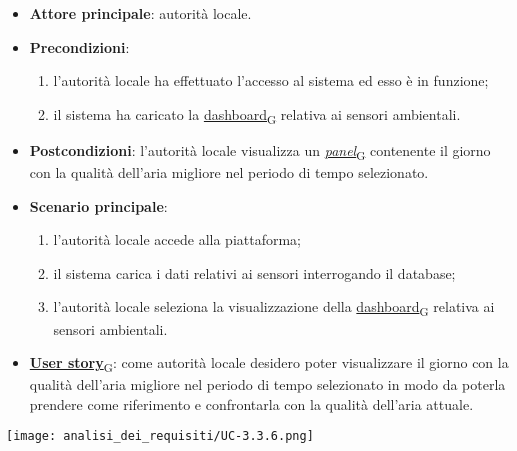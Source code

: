 \begin{itemize}
	\item \textbf{Attore principale}: autorità locale.
	\item \textbf{Precondizioni}:
	      \begin{enumerate}
		      \item l'autorità locale ha effettuato l'accesso al sistema ed esso è in funzione;
		      \item il sistema ha caricato la \href{https://7last.github.io/docs/pb/documentazione-interna/glossario\#dashboard}{dashboard\textsubscript{G}} relativa ai sensori ambientali.
	      \end{enumerate}
	\item \textbf{Postcondizioni}: l'autorità locale visualizza un \href{https://7last.github.io/docs/pb/documentazione-interna/glossario\#panel}{\textit{panel}\textsubscript{G}} contenente il giorno con la qualità dell'aria migliore nel periodo di tempo selezionato.
	\item \textbf{Scenario principale}:
	      \begin{enumerate}
		      \item l'autorità locale accede alla piattaforma;
		      \item il sistema carica i dati relativi ai sensori interrogando il database;
		      \item l'autorità locale seleziona la visualizzazione della \href{https://7last.github.io/docs/pb/documentazione-interna/glossario\#dashboard}{dashboard\textsubscript{G}} relativa ai sensori ambientali.
	      \end{enumerate}
	\item \href{https://7last.github.io/docs/pb/documentazione-interna/glossario\#user-story}{\textbf{User story}\textsubscript{G}}:
	      come autorità locale desidero poter visualizzare il giorno con la qualità dell'aria migliore nel periodo di tempo selezionato
	      in modo da poterla prendere come riferimento e confrontarla con la qualità dell'aria attuale.
\end{itemize}
\begin{center}
	\texttt{[image: analisi\_dei\_requisiti/UC-3.3.6.png]}
\end{center}

